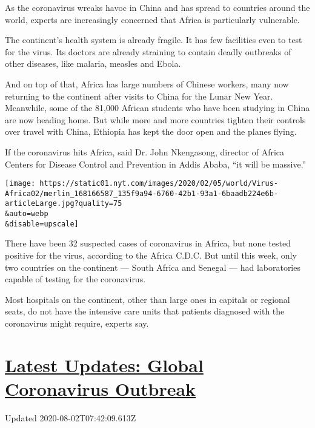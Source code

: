 As the coronavirus wreaks havoc in China and has spread to countries
around the world, experts are increasingly concerned that Africa is
particularly vulnerable.

The continent's health system is already fragile. It has few facilities
even to test for the virus. Its doctors are already straining to contain
deadly outbreaks of other diseases, like malaria, measles and Ebola.

And on top of that, Africa has large numbers of Chinese workers, many
now returning to the continent after visits to China for the Lunar New
Year. Meanwhile, some of the 81,000 African students who have been
studying in China are now heading home. But while more and more
countries tighten their controls over travel with China, Ethiopia has
kept the door open and the planes flying.

If the coronavirus hits Africa, said Dr. John Nkengasong, director of
Africa Centers for Disease Control and Prevention in Addis Ababa, ``it
will be massive.''

\texttt{[image: https://static01.nyt.com/images/2020/02/05/world/Virus-Africa02/merlin\_168166587\_135f9a94-6760-42b1-93a1-6baadb224e6b-articleLarge.jpg?quality=75\\\&auto=webp\\\&disable=upscale]}

There have been 32 suspected cases of coronavirus in Africa, but none
tested positive for the virus, according to the Africa C.D.C. But until
this week, only two countries on the continent --- South Africa and
Senegal --- had laboratories capable of testing for the coronavirus.

Most hospitals on the continent, other than large ones in capitals or
regional seats, do not have the intensive care units that patients
diagnosed with the coronavirus might require, experts say.

\hypertarget{latest-updates-global-coronavirus-outbreak}{%
\section{\texorpdfstring{\href{https://www.nytimes.com/2020/08/01/world/coronavirus-covid-19.html?action=click\&pgtype=Article\&state=default\&region=MAIN_CONTENT_1\&context=storylines_live_updates}{Latest
Updates: Global Coronavirus
Outbreak}}{Latest Updates: Global Coronavirus Outbreak}}\label{latest-updates-global-coronavirus-outbreak}}

Updated 2020-08-02T07:42:09.613Z

